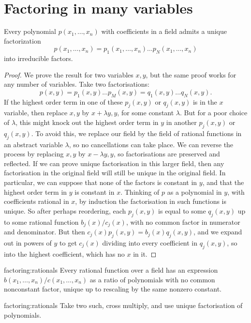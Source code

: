 \section{Factoring in many variables}
\begin{theorem}\label{theorem:ufd}
Every polynomial \(p(x_1,\dots,x_n)\) with coefficients in a field admits a unique factorization
\[
p(x_1,\dots,x_n)=p_1(x_1,\dots,x_n)\dots p_N(x_1,\dots,x_n)
\]
into irreducible factors.
\end{theorem}
\begin{proof}
We prove the result for two variables \(x,y\), but the same proof works for any number of variables.
Take two factorisations:
\[
p(x,y)=p_1(x,y)\dots p_M(x,y)=q_1(x,y)\dots q_N(x,y).
\]
If the highest order term in one of these \(p_j(x,y)\) or \(q_j(x,y)\) is in the \(x\) variable, then replace \(x,y\) by \(x+\lambda y,y\), for some constant \(\lambda\).
But for a poor choice of \(\lambda\), this might knock out the highest order term in \(y\) in another \(p_j(x,y)\) or \(q_j(x,y)\).
To avoid this, we replace our field by the field of rational functions in an abstract variable \(\lambda\), so no cancellations can take place.
We can reverse the process by replacing \(x,y\) by \(x-\lambda y,y\), so factorisations are preserved and reflected.
If we can prove unique factorisation in this larger field, then any factorisation in the original field will still be unique in the original field.
In particular, we can suppose that none of the factors is constant in \(y\), and that the highest order term in \(y\) is constant in \(x\).
Thinking of \(p\) as a polynomial in \(y\), with coefficients rational in \(x\), by induction the factorisation in such functions is unique.
So after perhaps reordering, each \(p_j(x,y)\) is equal to some \(q_j(x,y)\) up to some rational function \(b_j(x)/c_j(x)\), with no common factor in numerator and denominator.
But then \(c_j(x)p_j(x,y)=b_j(x)q_j(x,y)\), and we expand out in powers of \(y\) to get \(c_j(x)\) dividing into every coefficient in \(q_j(x,y)\), so into the highest coefficient, which has no \(x\) in it.
\end{proof}

\begin{problem}{factoring:rationals}
Every rational function over a field has an expression \(b(x_1,\dots,x_n)/c(x_1,\dots,x_n)\) as a ratio of polynomials with no common nonconstant factor, unique up to rescaling by the same nonzero constant.
\end{problem}
\begin{answer}{factoring:rationals}
Take two such, cross multiply, and use unique factorisation of polynomials.
\end{answer}
